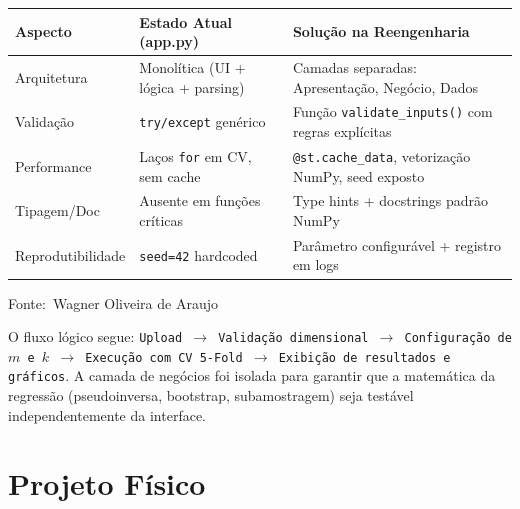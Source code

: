 \documentclass[12pt,a4paper]{article}
\newcommand{\oautor}{Wagner Oliveira de Araujo}
\begin{document}
\begin{quadro}[ht]
\begin{center}
\small
\caption{Diagnóstico do código legado e arquitetura proposta}
\label{quadro:diagnostico}
\begin{threeparttable}
\begin{tabularx}{\textwidth}{|l|X|X|} \hline
\textbf{Aspecto} & \textbf{Estado Atual (app.py)} & \textbf{Solução na Reengenharia} \\ \hline
Arquitetura & Monolítica (UI + lógica + parsing) & Camadas separadas: Apresentação, Negócio, Dados \\ \hline
Validação & \texttt{try/except} genérico & Função \texttt{validate\_inputs()} com regras explícitas \\ \hline
Performance & Laços \texttt{for} em CV, sem cache & \texttt{@st.cache\_data}, vetorização NumPy, seed exposto \\ \hline
Tipagem/Doc & Ausente em funções críticas & Type hints + docstrings padrão NumPy \\ \hline
Reprodutibilidade & \texttt{seed=42} hardcoded & Parâmetro configurável + registro em logs \\ \hline
\end{tabularx}
\begin{tablenotes}[flushleft]
\footnotesize
\item Fonte:~\oautor
\end{tablenotes}
\end{threeparttable}
\end{center}
\end{quadro}

O fluxo lógico segue: \texttt{Upload $\rightarrow$ Validação dimensional $\rightarrow$ Configuração de $m$ e $k$ $\rightarrow$ Execução com CV 5-Fold $\rightarrow$ Exibição de resultados e gráficos}. A camada de negócios foi isolada para garantir que a matemática da regressão (pseudoinversa, bootstrap, subamostragem) seja testável independentemente da interface.

\section{Projeto Físico}
\end{document}
